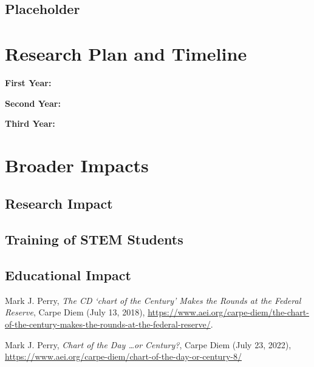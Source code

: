 \documentclass[11pt]{article}
\theoremstyle{theorem}
\theoremstyle{definition}
\begin{document}
\subsection{Placeholder}


\section{Research Plan and Timeline}


\noindent\textbf{First Year:}  

\noindent\textbf{Second Year:}  

\noindent\textbf{Third Year:}  
\section{Broader Impacts}

\subsection{Research Impact}


\subsection{Training of STEM Students}

\subsection{Educational Impact}    


\newpage

\begin{thebibliography}{99}
   Mark J. Perry, {\em The CD `chart of the Century' Makes the Rounds at the Federal Reserve}, Carpe Diem (July 13, 2018), \href{https://www.aei.org/carpe-diem/the-chart-of-the-century-makes-the-rounds-at-the-federal-reserve/}{https://www.aei.org/carpe-diem/the-chart-of-the-century-makes-the-rounds-at-the-federal-reserve/}.

   Mark J. Perry, {\em Chart of the Day \ldots or Century?}, Carpe Diem (July 23, 2022), \href{https://www.aei.org/carpe-diem/chart-of-the-day-or-century-8/}{https://www.aei.org/carpe-diem/chart-of-the-day-or-century-8/}
\end{thebibliography}
\end{document}

